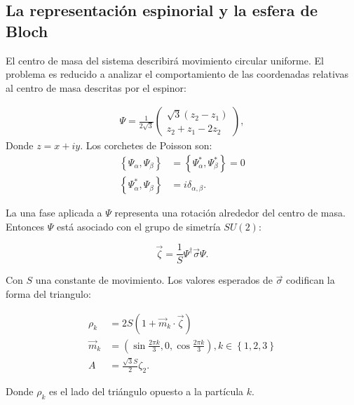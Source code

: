 \documentclass[xcolor=dvipsnames]{beamer}
\newcommand{\roundP}[1]{\left( #1 \right)}
\newcommand{\poisson}[2]{\left\lbrace #1, #2 \right\rbrace}
\begin{document}
\subsection{La representación espinorial y la esfera de Bloch}
\begin{frame}
El centro de masa del sistema describirá movimiento circular uniforme. El problema es reducido a analizar el comportamiento de las coordenadas relativas al centro de masa descritas por el espinor:

\begin{align*}
\Psi = \frac{1}{2\sqrt{3}}\begin{pmatrix}\sqrt{3}\roundP{z_{2}-z_{1}}\\
z_{2}+z_{1}-2z_{2}\end{pmatrix},
\end{align*}
Donde $z = x+iy$. Los corchetes de Poisson son:
\begin{align*}
\poisson{\Psi_\alpha}{\Psi_\beta} &= \poisson{\Psi_\alpha^*}{\Psi_\beta^*} = 0\\
\poisson{\Psi_\alpha^*}{\Psi_\beta} &= i\delta_{\alpha,\beta}.
\end{align*}
\end{frame}
\begin{frame}
La una fase aplicada a $\Psi$ representa una rotación alrededor del centro de masa. Entonces $\Psi$ está asociado con el grupo de simetría $SU(2)$:

\begin{equation*}
\vec{\zeta} = \frac{1}{S} \Psi^{\dagger}\vec{\sigma}\Psi.
\end{equation*}

Con $S$ una constante de movimiento. Los valores esperados de $\vec{\sigma}$ codifican la forma del triangulo: 

\begin{equation*}
\begin{aligned}
\rho_k &= 2S\roundP{1+\vec{m}_k\cdot\vec{\zeta}}\\
\vec{m}_k &= \roundP{\sin{\frac{2\pi k}{3}},0,\cos{\frac{2\pi k}{3}}}, k \in \poisson{1,2}{3}\\
A &= \frac{\sqrt{3}S}{2} \zeta_2.
\end{aligned}
\end{equation*}

Donde $\rho_k$ es el lado del triángulo opuesto a la partícula $k$.

\end{frame}
\end{document}
